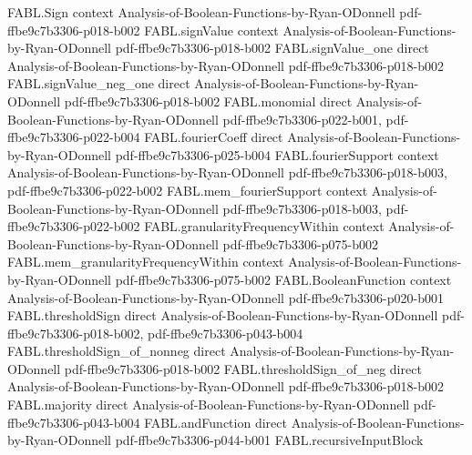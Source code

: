 \begin{theorem}
\label{FABL.andFunction_unanimous}
\leanok
{}
\proofstep
  {FABL.Sign}
  {context}
  {Analysis-of-Boolean-Functions-by-Ryan-ODonnell}
  {pdf-ffbe9c7b3306-p018-b002}
\proofstep
  {FABL.signValue}
  {context}
  {Analysis-of-Boolean-Functions-by-Ryan-ODonnell}
  {pdf-ffbe9c7b3306-p018-b002}
\proofstep
  {FABL.signValue_one}
  {direct}
  {Analysis-of-Boolean-Functions-by-Ryan-ODonnell}
  {pdf-ffbe9c7b3306-p018-b002}
\proofstep
  {FABL.signValue_neg_one}
  {direct}
  {Analysis-of-Boolean-Functions-by-Ryan-ODonnell}
  {pdf-ffbe9c7b3306-p018-b002}
\proofstep
  {FABL.monomial}
  {direct}
  {Analysis-of-Boolean-Functions-by-Ryan-ODonnell}
  {pdf-ffbe9c7b3306-p022-b001,
    pdf-ffbe9c7b3306-p022-b004}
\proofstep
  {FABL.fourierCoeff}
  {direct}
  {Analysis-of-Boolean-Functions-by-Ryan-ODonnell}
  {pdf-ffbe9c7b3306-p025-b004}
\proofstep
  {FABL.fourierSupport}
  {context}
  {Analysis-of-Boolean-Functions-by-Ryan-ODonnell}
  {pdf-ffbe9c7b3306-p018-b003,
    pdf-ffbe9c7b3306-p022-b002}
\proofstep
  {FABL.mem_fourierSupport}
  {context}
  {Analysis-of-Boolean-Functions-by-Ryan-ODonnell}
  {pdf-ffbe9c7b3306-p018-b003,
    pdf-ffbe9c7b3306-p022-b002}
\proofstep
  {FABL.granularityFrequencyWithin}
  {context}
  {Analysis-of-Boolean-Functions-by-Ryan-ODonnell}
  {pdf-ffbe9c7b3306-p075-b002}
\proofstep
  {FABL.mem_granularityFrequencyWithin}
  {context}
  {Analysis-of-Boolean-Functions-by-Ryan-ODonnell}
  {pdf-ffbe9c7b3306-p075-b002}
\proofstep
  {FABL.BooleanFunction}
  {context}
  {Analysis-of-Boolean-Functions-by-Ryan-ODonnell}
  {pdf-ffbe9c7b3306-p020-b001}
\proofstep
  {FABL.thresholdSign}
  {direct}
  {Analysis-of-Boolean-Functions-by-Ryan-ODonnell}
  {pdf-ffbe9c7b3306-p018-b002,
    pdf-ffbe9c7b3306-p043-b004}
\proofstep
  {FABL.thresholdSign_of_nonneg}
  {direct}
  {Analysis-of-Boolean-Functions-by-Ryan-ODonnell}
  {pdf-ffbe9c7b3306-p018-b002}
\proofstep
  {FABL.thresholdSign_of_neg}
  {direct}
  {Analysis-of-Boolean-Functions-by-Ryan-ODonnell}
  {pdf-ffbe9c7b3306-p018-b002}
\proofstep
  {FABL.majority}
  {direct}
  {Analysis-of-Boolean-Functions-by-Ryan-ODonnell}
  {pdf-ffbe9c7b3306-p043-b004}
\proofstep
  {FABL.andFunction}
  {direct}
  {Analysis-of-Boolean-Functions-by-Ryan-ODonnell}
  {pdf-ffbe9c7b3306-p044-b001}
\proofstep
  {FABL.recursiveInputBlock}

\end{theorem}
